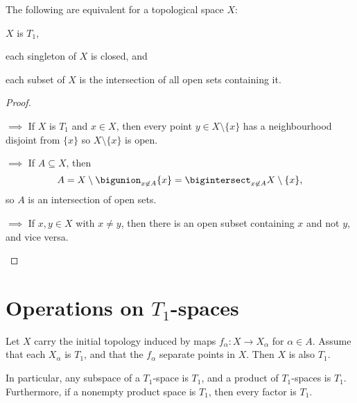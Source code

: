 \documentclass[article, a4paper, 11pt, oneside]{memoir}
\numberwithin{equation}{chapter}
\begin{document}
\begin{proposition}
    The following are equivalent for a topological space $X$:
    \begin{enumprop}
        \item \label{enum:T1-space} $X$ is $T_1$,
        \item \label{enum:T1-singletons-closed} each singleton of $X$ is closed, and
        \item \label{enum:T1-intersection-of-open-sets} each subset of $X$ is the intersection of all open sets containing it.
    \end{enumprop}
\end{proposition}

\begin{proof}
\begin{proofsec}
    \item[\subcref{enum:T1-space} $\implies$ \subcref{enum:T1-singletons-closed}]
    If $X$ is $T_1$ and $x \in X$, then every point $y \in X \setminus \{x\}$ has a neighbourhood disjoint from $\{x\}$ so $X \setminus \{x\}$ is open.

    \item[\subcref{enum:T1-singletons-closed} $\implies$ \subcref{enum:T1-intersection-of-open-sets}]
    If $A \subseteq X$, then
    \begin{equation*}
        A   = X \setminus \bigunion_{x \not\in A} \{x\}
            = \bigintersect_{x \not\in A} X \setminus \{x\},
    \end{equation*}
    so $A$ is an intersection of open sets.

    \item[\subcref{enum:T1-intersection-of-open-sets} $\implies$ \subcref{enum:T1-space}]
    If $x,y \in X$ with $x \neq y$, then there is an open subset containing $x$ and not $y$, and vice versa.
\end{proofsec}
\end{proof}


\section[Operations on T1-spaces][Operations on $T_1$-spaces]{Operations on $T_1$-spaces}

\begin{proposition}
    \label{thm:T1-initial-topology}
    Let $X$ carry the initial topology induced by maps $f_\alpha \colon X \to X_\alpha$ for $\alpha \in A$. Assume that each $X_\alpha$ is $T_1$, and that the $f_\alpha$ separate points in $X$. Then $X$ is also $T_1$.

    In particular, any subspace of a $T_1$-space is $T_1$, and a product of $T_1$-spaces is $T_1$. Furthermore, if a nonempty product space is $T_1$, then every factor is $T_1$.
\end{proposition}
\end{document}
